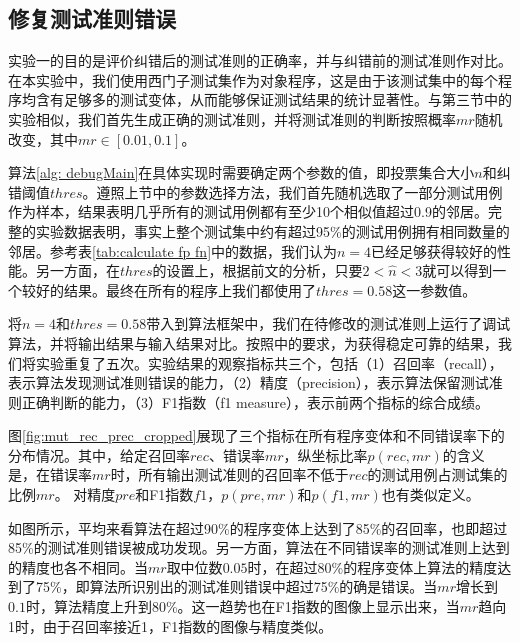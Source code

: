\subsection{修复测试准则错误}
\label{subsection: repair test oracle}
实验一的目的是评价纠错后的测试准则的正确率，并与纠错前的测试准则作对比。在本实验中，我们使用西门子测试集作为对象程序，这是由于该测试集中的每个程序均含有足够多的测试变体，从而能够保证测试结果的统计显著性。与第三节中的实验相似，我们首先生成正确的测试准则，并将测试准则的判断按照概率$mr$随机改变，其中$mr \in [0.01, 0.1]$。

算法\ref{alg: debugMain}在具体实现时需要确定两个参数的值，即投票集合大小$n$和纠错阈值$thres$。遵照上节中的参数选择方法，我们首先随机选取了一部分测试用例作为样本，结果表明几乎所有的测试用例都有至少10个相似值超过0.9的邻居。完整的实验数据表明，事实上整个测试集中约有超过95\%的测试用例拥有相同数量的邻居。参考表\ref{tab:calculate fp fn}中的数据，我们认为$n=4$已经足够获得较好的性能。另一方面，在$thres$的设置上，根据前文的分析，只要$2 < \hat{n} < 3$就可以得到一个较好的结果。最终在所有的程序上我们都使用了$thres = 0.58$这一参数值。

将$n = 4$和$thres = 0.58$带入到算法框架中，我们在待修改的测试准则上运行了调试算法，并将输出结果与输入结果对比。按照\cite{Steimann:2013:TVV:2483760.2483767}中的要求，为获得稳定可靠的结果，我们将实验重复了五次。实验结果的观察指标共三个，包括（1）召回率（recall），表示算法发现测试准则错误的能力，（2）精度（precision），表示算法保留测试准则正确判断的能力，（3）F1指数（f1 measure），表示前两个指标的综合成绩。

图\ref{fig:mut_rec_prec_cropped}展现了三个指标在所有程序变体和不同错误率下的分布情况。其中，给定召回率$rec$、错误率$mr$，纵坐标比率$p(rec, mr)$的含义是，在错误率$mr$时，所有输出测试准则的召回率不低于$rec$的测试用例占测试集的比例$mr$。 对精度$pre$和F1指数$f1$，$p(pre, mr)$和$p(f1, mr)$也有类似定义。

如图所示，平均来看算法在超过90\%的程序变体上达到了85\%的召回率，也即超过85\%的测试准则错误被成功发现。另一方面，算法在不同错误率的测试准则上达到的精度也各不相同。当$mr$取中位数$0.05$时，在超过80\%的程序变体上算法的精度达到了75\%，即算法所识别出的测试准则错误中超过75\%的确是错误。当$mr$增长到$0.1$时，算法精度上升到80\%。这一趋势也在F1指数的图像上显示出来，当$mr$趋向1时，由于召回率接近1，F1指数的图像与精度类似。

